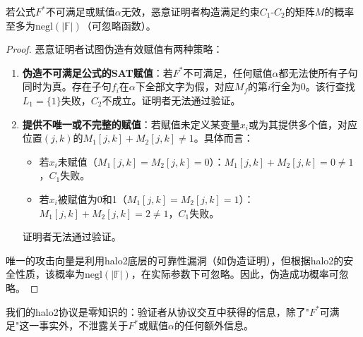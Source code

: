 \begin{theorem}[SAT验证的可靠性]
若公式$F^*$不可满足或赋值$\alpha$无效，恶意证明者构造满足约束$C_1$-$C_2$的矩阵$M$的概率至多为$\text{negl}(|\mathbb{F}|)$（可忽略函数）。
\end{theorem}

\begin{proof}
恶意证明者试图伪造有效赋值有两种策略：
\begin{enumerate}
    \item \textbf{伪造不可满足公式的SAT赋值}：若$F^*$不可满足，任何赋值$\alpha$都无法使所有子句同时为真。存在子句$f_i$在$\alpha$下全部文字为假，对应$M_f$的第$i$行全为0。该行查找$L_1 = \{1\}$失败，$C_2$不成立。证明者无法通过验证。
    \item \textbf{提供不唯一或不完整的赋值}：若赋值未定义某变量$x_i$或为其提供多个值，对应位置$(j,k)$的$M_1[j,k] + M_2[j,k] \neq 1$。具体而言：
    \begin{itemize}
        \item 若$x_i$未赋值（$M_1[j,k] = M_2[j,k] = 0$）：$M_1[j,k] + M_2[j,k] = 0 \neq 1$，$C_1$失败。
        \item 若$x_i$被赋值为0和1（$M_1[j,k] = M_2[j,k] = 1$）：$M_1[j,k] + M_2[j,k] = 2 \neq 1$，$C_1$失败。
    \end{itemize}
    证明者无法通过验证。
\end{enumerate}
唯一的攻击向量是利用halo2底层的可靠性漏洞（如伪造证明），但根据halo2的安全性质，该概率为$\text{negl}(|\mathbb{F}|)$，在实际参数下可忽略。因此，伪造成功概率可忽略。
\end{proof}

\begin{theorem}[SAT验证的零知识性]
我们的halo2协议是零知识的：验证者从协议交互中获得的信息，除了"$F^*$可满足"这一事实外，不泄露关于$F^*$或赋值$\alpha$的任何额外信息。
\end{theorem}

